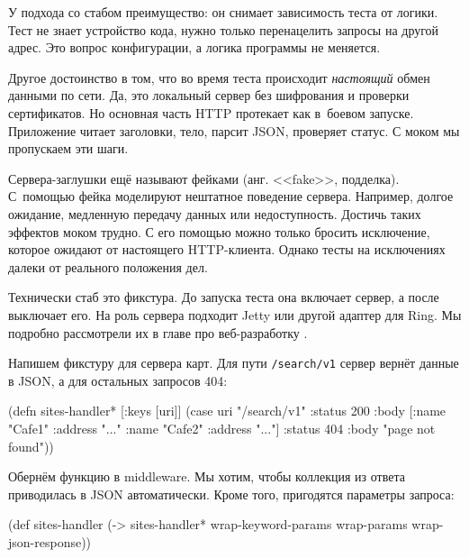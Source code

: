У подхода со стабом преимущество: он снимает зависимость теста от логики. Тест
не знает устройство кода, нужно только перенацелить запросы на другой адрес. Это
вопрос конфигурации, а логика программы не меняется.

Другое достоинство в том, что во время теста происходит \emph{настоящий} обмен
данными по сети. Да, это локальный сервер без шифрования и проверки
сертификатов. Но основная часть HTTP протекает как в~боевом запуске. Приложение
читает заголовки, тело, парсит JSON, проверяет статус. С моком мы пропускаем эти
шаги.


Сервера-заглушки ещё называют фейками (анг. <<fake>>, подделка). С~помощью фейка
моделируют нештатное поведение сервера. Например, долгое ожидание, медленную
передачу данных или недоступность. Достичь таких эффектов моком трудно. С его
помощью можно только бросить исключение, которое ожидают от настоящего
HTTP-клиента. Однако тесты на исключениях далеки от реального положения дел.

Технически стаб это фикстура. До запуска теста она включает сервер, а после
выключает его. На роль сервера подходит Jetty или другой адаптер для Ring. Мы
подробно рассмотрели их в главе про веб-разработку .

Напишем фикстуру для сервера карт. Для пути \verb|/search/v1| сервер вернёт
данные в JSON, а для остальных запросов 404:

\label{sites-handler}

\begin{english}
  \begin{clojure}
(defn sites-handler* [{:keys [uri]}]
  (case uri
    "/search/v1"
    {:status 200
     :body [{:name "Cafe1" :address "..."}
            {:name "Cafe2" :address "..."}]}
    {:status 404 :body "page not found"}))
  \end{clojure}
\end{english}


Обернём функцию в middleware. Мы хотим, чтобы коллекция из ответа приводилась в
JSON автоматически. Кроме того, пригодятся параметры запроса:

\begin{english}
  \begin{clojure}
(def sites-handler
  (-> sites-handler*
      wrap-keyword-params
      wrap-params
      wrap-json-response))
  \end{clojure}
\end{english}

